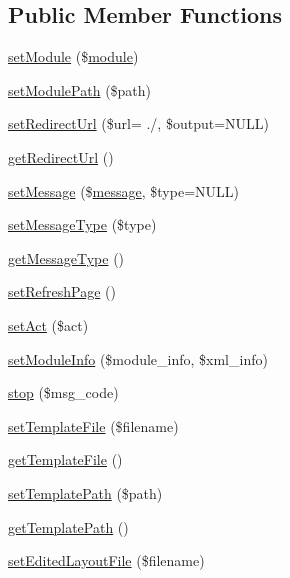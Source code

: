 \subsection*{Public Member Functions}
\begin{DoxyCompactItemize}
\item 
\hyperlink{classModuleObject_a610f40078a4c8590452eaedf794350ed}{set\+Module} (\$\hyperlink{classmodule}{module})
\item 
\hyperlink{classModuleObject_a277cebf9e472c1af7c00eab68414a567}{set\+Module\+Path} (\$path)
\item 
\hyperlink{classModuleObject_ac5126aa7f57a52e7f26b18b9040f5501}{set\+Redirect\+Url} (\$url= \textquotesingle{}./\textquotesingle{}, \$output=N\+U\+L\+L)
\item 
\hyperlink{classModuleObject_ae7c0b4d36f7ef9e8b3ec59a6a9bf6116}{get\+Redirect\+Url} ()
\item 
\hyperlink{classModuleObject_ac0e69111c80e589a4da7899fc7c75fe5}{set\+Message} (\$\hyperlink{classmessage}{message}, \$type=N\+U\+L\+L)
\item 
\hyperlink{classModuleObject_a9f65f760815bb7c6667a2e521578af10}{set\+Message\+Type} (\$type)
\item 
\hyperlink{classModuleObject_aa0c2daa9dda892df56eb5fe7c754e25b}{get\+Message\+Type} ()
\item 
\hyperlink{classModuleObject_a6d0d3436c8c64591e1a3534647714969}{set\+Refresh\+Page} ()
\item 
\hyperlink{classModuleObject_a35d0b9120ea393d4b4177b0c667e198c}{set\+Act} (\$act)
\item 
\hyperlink{classModuleObject_afbcee54b026b35a2a4b4a454724bb9be}{set\+Module\+Info} (\$module\+\_\+info, \$xml\+\_\+info)
\item 
\hyperlink{classModuleObject_ac4c2bac7917c3ab3a0e816b99574727c}{stop} (\$msg\+\_\+code)
\item 
\hyperlink{classModuleObject_aa38e116023d54d3f5d8f507bb87663f4}{set\+Template\+File} (\$filename)
\item 
\hyperlink{classModuleObject_af5456f80bf7bd5d3c20dd6547423a419}{get\+Template\+File} ()
\item 
\hyperlink{classModuleObject_a440407bd8b6b16eb03115ad4a5c5835a}{set\+Template\+Path} (\$path)
\item 
\hyperlink{classModuleObject_a10f29d4a49d7e24bdab4e348633c6609}{get\+Template\+Path} ()
\item 
\hyperlink{classModuleObject_a28e95b299aeac82b450e6ed8b121ff05}{set\+Edited\+Layout\+File} (\$filename)

\end{DoxyCompactItemize}
